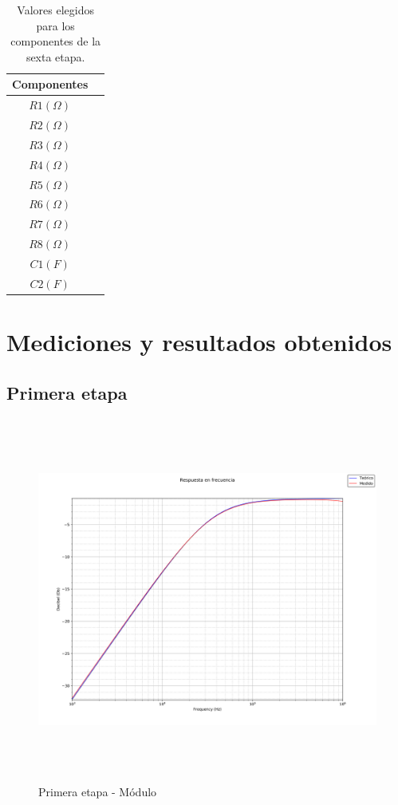 \begin{table}[H] 
	\centering
	\begin{tabular}{c c}
		Componentes \\
		\hline
		$R1 (\Omega)$ &   \\
		$R2 (\Omega)$ &   \\
		$R3 (\Omega)$ &   \\
		$R4 (\Omega)$ &   \\
		$R5 (\Omega)$ &   \\
		$R6 (\Omega)$ &   \\
		$R7 (\Omega)$ &   \\
		$R8 (\Omega)$ &   \\
		$C1 (F)$ &  \\
		$C2 (F)$ &  \\
		\hline
	\end{tabular}
	\caption{Valores elegidos para los componentes de la sexta etapa.}
	\label{componentes6}
\end{table}

\section{Mediciones y resultados obtenidos}

\subsection{Primera etapa}

 \begin{figure}[H] %
	\centering
	\includegraphics[width=12cm,height=12cm,keepaspectratio]{../Imagenes/FIRST_MOD.png}
	\caption{Primera etapa - M\'odulo}
	\label{firstmod}
\end{figure}

